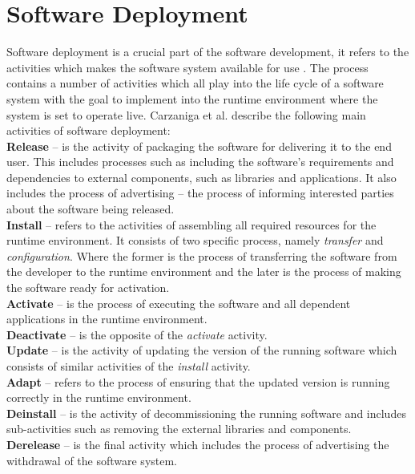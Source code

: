 \section{Software Deployment}

Software deployment is a crucial part of the software development, it refers to the activities which makes the software system available for use \cite{carzaniga1998characterization}. The process contains a number of activities which all play into the life cycle of a software system with the goal to implement into the runtime environment where the system is set to operate live. Carzaniga et al. describe the following main activities of software deployment: \\

\textbf{Release} – is the activity of packaging the software for delivering it to the end user. This includes processes such as including the software's requirements and dependencies to external components, such as libraries and applications. It also includes the process of advertising – the process of informing interested parties about the software being released.\\
\textbf{Install} – refers to the activities of assembling all required resources for the runtime environment. It consists of two specific process, namely \textit{transfer} and \textit{configuration}. Where the former is the process of transferring the software from the developer to the runtime environment and the later is the process of making the software ready for activation.\\
\textbf{Activate} – is the process of executing the software and all dependent applications in the runtime environment.\\
\textbf{Deactivate} – is the opposite of the \textit{activate} activity.\\
\textbf{Update} – is the activity of updating the version of the running software which consists of similar activities of the \textit{install} activity.\\
\textbf{Adapt} – refers to the process of ensuring that the updated version is running correctly in the runtime environment.\\
\textbf{Deinstall} – is the activity of decommissioning the running software and includes sub-activities such as removing the external libraries and components.\\
\textbf{Derelease} – is the final activity which includes the process of advertising the withdrawal of the software system.\\

